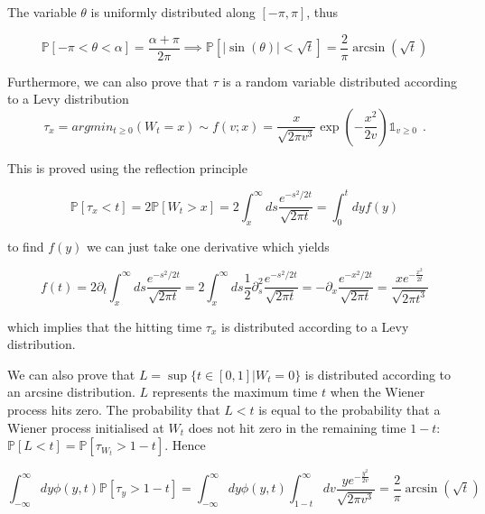 \documentclass[11pt,a4paper]{article}
\begin{document}
The variable $\theta$ is uniformly distributed along $[-\pi,\pi]$, thus 

\begin{equation}
    \mathbb{P}[-\pi<\theta <\alpha] = \frac{\alpha+\pi}{2\pi} \implies \mathbb{P}[|\sin(\theta)| <\sqrt{t}] = \frac{2}{\pi} \arcsin(\sqrt{t})
\end{equation}


Furthermore, we can also prove that $\tau$ is a random variable distributed according to a Levy distribution
\begin{equation}
    \tau_x = argmin_{t \geq 0}(W_t = x) \sim  f(v; x) =  \frac{x}{\sqrt{2 \pi v^3}}\exp(-\frac{x^2}{2v})\mathds{1}_{v\geq 0} \hspace{5pt}.
\end{equation}

This is proved using the reflection principle

\begin{equation}
    \mathbb{P}[\tau_x<t] = 2 \mathbb{P}[W_t>x] = 2 \int_{x}^{\infty}ds \frac{e^{-s^2/2t}}{\sqrt{2\pi t}} = \int_{0}^{t}dyf(y)
\end{equation}

to find $f(y)$ we can just take one derivative which yields

\begin{equation}
f(t) = 2 \partial_t  \int_{x}^{\infty}ds \frac{e^{-s^2/2t}}{\sqrt{2\pi t}} = 2 \int_{x}^{\infty}ds \frac{1}{2}\partial^2_{s}\frac{e^{-s^2/2t}}{\sqrt{2\pi t}} = -\partial_{x}\frac{e^{-x^2/2t}}{\sqrt{2\pi t}} = \frac{x e^{-\frac{x^2}{2t}}}{\sqrt{2\pi t^3}}
\end{equation}

which implies that the hitting time $\tau_x$ is distributed according to a Levy distribution.

We can also prove that $L = \sup\{t \in [0,1]| W_t = 0\}$ is distributed according to an arcsine distribution. $L$ represents the maximum time $t$ when the Wiener process hits zero. The probability that $L<t$ is equal to the probability that a Wiener process initialised at $W_t$ does not hit zero in the remaining time $1-t$: $\mathbb{P}[L<t] = \mathbb{P}[\tau_{W_t}>1-t]$. Hence

\begin{equation}
    \int_{-\infty}^{\infty}dy \phi(y,t) \mathbb{P}[\tau_y>1-t] = \int_{-\infty}^{\infty}dy \phi(y,t)\int_{1-t}^{\infty} dv \frac{y e^{-\frac{y^2}{2v}}}{\sqrt{2\pi v^3}} = \frac{2}{\pi}\arcsin(\sqrt{t})
\end{equation}
\end{document}
